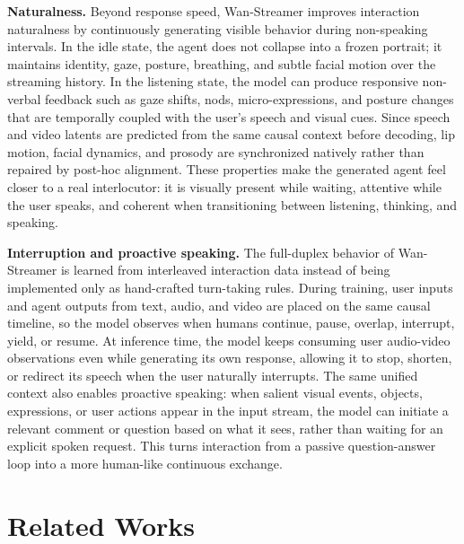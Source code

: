 \documentclass[]{style/style}
\newcommand{\model}{Wan-Streamer\xspace}
\begin{document}
\textbf{Naturalness.}
Beyond response speed, \model improves interaction naturalness by continuously generating visible behavior during non-speaking intervals. In the idle state, the agent does not collapse into a frozen portrait; it maintains identity, gaze, posture, breathing, and subtle facial motion over the streaming history. In the listening state, the model can produce responsive non-verbal feedback such as gaze shifts, nods, micro-expressions, and posture changes that are temporally coupled with the user's speech and visual cues. Since speech and video latents are predicted from the same causal context before decoding, lip motion, facial dynamics, and prosody are synchronized natively rather than repaired by post-hoc alignment. These properties make the generated agent feel closer to a real interlocutor: it is visually present while waiting, attentive while the user speaks, and coherent when transitioning between listening, thinking, and speaking.

\textbf{Interruption and proactive speaking.}
The full-duplex behavior of \model is learned from interleaved interaction data instead of being implemented only as hand-crafted turn-taking rules. During training, user inputs and agent outputs from text, audio, and video are placed on the same causal timeline, so the model observes when humans continue, pause, overlap, interrupt, yield, or resume. At inference time, the model keeps consuming user audio-video observations even while generating its own response, allowing it to stop, shorten, or redirect its speech when the user naturally interrupts. The same unified context also enables proactive speaking: when salient visual events, objects, expressions, or user actions appear in the input stream, the model can initiate a relevant comment or question based on what it sees, rather than waiting for an explicit spoken request. This turns interaction from a passive question-answer loop into a more human-like continuous exchange.


\FloatBarrier


\section{Related Works}
\end{document}

